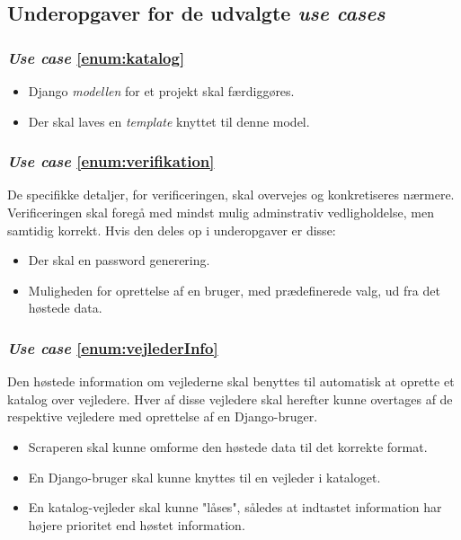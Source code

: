 \documentclass[11pt]{article}
\begin{document}
\subsection{Underopgaver for de udvalgte \textit{use cases}}
\subsubsection*{\textit{Use case} \ref{enum:katalog}}
\begin{itemize}
	\item Django \textit{modellen} for et projekt skal færdiggøres.
	\item Der skal laves en \textit{template} knyttet til denne model.
\end{itemize}

\subsubsection*{\textit{Use case} \ref{enum:verifikation}}
De specifikke detaljer, for verificeringen, skal overvejes og konkretiseres nærmere. Verificeringen skal foregå med mindst mulig adminstrativ vedligholdelse, men samtidig korrekt. Hvis den deles op i underopgaver er disse:
\begin{itemize}
	\item Der skal en password generering.
	\item Muligheden for oprettelse af en bruger, med prædefinerede valg, ud fra det høstede data.
\end{itemize}

\subsubsection*{\textit{Use case} \ref{enum:vejlederInfo}}
Den høstede information om vejlederne skal benyttes til automatisk at oprette et katalog over vejledere. Hver af disse vejledere skal herefter kunne overtages af de respektive vejledere med oprettelse af en Django-bruger.
\begin{itemize}
	\item Scraperen skal kunne omforme den høstede data til det korrekte format.
	\item En Django-bruger skal kunne knyttes til en vejleder i kataloget.
	\item En katalog-vejleder skal kunne "låses", således at indtastet information har højere prioritet end høstet information.
\end{itemize}
\end{document}
